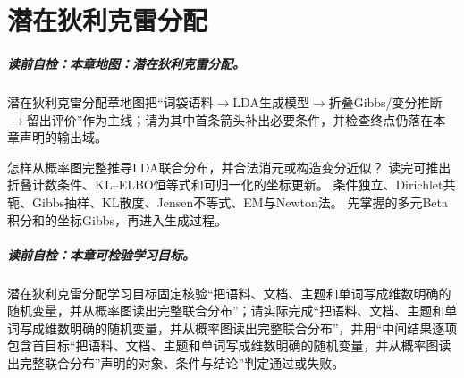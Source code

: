 
\chapter{潜在狄利克雷分配}\label{chap:V5-C06}

\paragraph{读前自检：本章地图：潜在狄利克雷分配。}潜在狄利克雷分配章地图把“词袋语料$\to$LDA生成模型$\to$折叠Gibbs/变分推断$\to$留出评价”作为主线；请为其中首条箭头补出必要条件，并检查终点仍落在本章声明的输出域。\par

{怎样从概率图完整推导LDA联合分布，并合法消元或构造变分近似？}
{读完可推出折叠计数条件、KL--ELBO恒等式和可归一化的坐标更新。}
{条件独立、Dirichlet共轭、Gibbs抽样、KL散度、Jensen不等式、EM与Newton法。}
{先掌握的多元Beta积分和的坐标Gibbs，再进入生成过程。}

\label{struct:V5-C06-CH01}
\paragraph{读前自检：本章可检验学习目标。}潜在狄利克雷分配学习目标固定核验“把语料、文档、主题和单词写成维数明确的随机变量，并从概率图读出完整联合分布”；请实际完成“把语料、文档、主题和单词写成维数明确的随机变量，并从概率图读出完整联合分布”，并用“中间结果逐项包含首目标“把语料、文档、主题和单词写成维数明确的随机变量，并从概率图读出完整联合分布”声明的对象、条件与结论”判定通过或失败。\par

